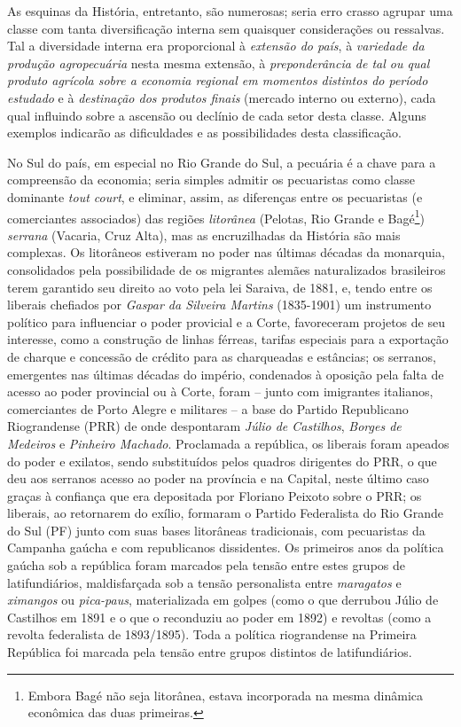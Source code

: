 As esquinas da História, entretanto, são numerosas; seria erro crasso agrupar uma classe com tanta diversificação interna sem quaisquer considerações ou ressalvas. Tal a diversidade interna era proporcional à \textit{extensão do país}, à \textit{variedade da produção agropecuária} nesta mesma extensão, à \textit{preponderância de tal ou qual produto agrícola sobre a economia regional em momentos distintos do período estudado} e à \textit{destinação dos produtos finais} (mercado interno ou externo), cada qual influindo sobre a ascensão ou declínio de cada setor desta classe. Alguns exemplos indicarão as dificuldades e as possibilidades desta classificação.

No Sul do país, em especial no Rio Grande do Sul, a pecuária é a chave para a compreensão da economia; seria simples admitir os pecuaristas como classe dominante \textit{tout court}, e eliminar, assim, as diferenças entre os pecuaristas (e comerciantes associados) das regiões \textit{litorânea} (Pelotas, Rio Grande e Bagé\footnote{Embora Bagé não seja litorânea, estava incorporada na mesma dinâmica econômica das duas primeiras.}) \textit{serrana} (Vacaria, Cruz Alta), mas as encruzilhadas da História são mais complexas. Os litorâneos estiveram no poder nas últimas décadas da monarquia, consolidados pela possibilidade de os migrantes alemães naturalizados brasileiros terem garantido seu direito ao voto pela lei Saraiva, de 1881, e, tendo entre os liberais chefiados por \textit{Gaspar da Silveira Martins} (1835-1901) um instrumento político para influenciar o poder provicial e a Corte, favoreceram projetos de seu interesse, como a construção de linhas férreas, tarifas especiais para a exportação de charque e concessão de crédito para as charqueadas e estâncias; os serranos, emergentes nas últimas décadas do império, condenados à oposição pela falta de acesso ao poder provincial ou à Corte, foram -- junto com imigrantes italianos, comerciantes de Porto Alegre e militares -- a base do Partido Republicano Riograndense (PRR) de onde despontaram \textit{Júlio de Castilhos}, \textit{Borges de Medeiros} e \textit{Pinheiro Machado}. Proclamada a república, os liberais foram apeados do poder e exilatos, sendo substituídos pelos quadros dirigentes do PRR, o que deu aos serranos acesso ao poder na província e na Capital, neste último caso graças à confiança que era depositada por Floriano Peixoto sobre o PRR; os liberais, ao retornarem do exílio, formaram o Partido Federalista do Rio Grande do Sul (PF) junto com suas bases litorâneas tradicionais, com pecuaristas da Campanha gaúcha e com republicanos dissidentes. Os primeiros anos da política gaúcha sob a república foram marcados pela tensão entre estes grupos de latifundiários, maldisfarçada sob a tensão personalista entre \textit{maragatos} e \textit{ximangos} ou \textit{pica-paus}, materializada em golpes (como o que derrubou Júlio de Castilhos em 1891 e o que o reconduziu ao poder em 1892) e revoltas (como a revolta federalista de 1893/1895). Toda a política riograndense na Primeira República foi marcada pela tensão entre grupos distintos de latifundiários.


